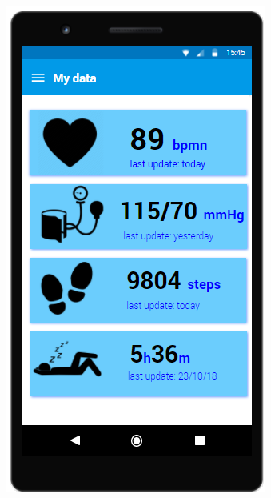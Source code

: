\begin{figure}[H]
\centering
\begin{minipage}{.5\textwidth}
  \centering
  \includegraphics[width=0.89\linewidth]{resources/Screen/IndividualMyData.png}
  \label{fig:App data homepage}
\end{minipage}%
\begin{minipage}{.5\textwidth}
  \centering

\end{minipage}
\end{figure}
